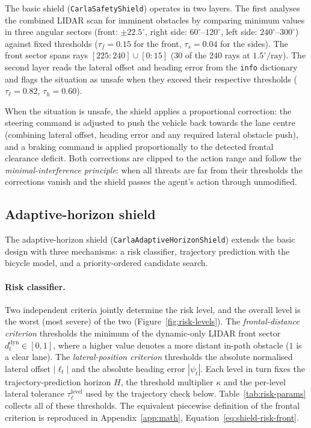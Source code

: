 The basic shield (\texttt{CarlaSafetyShield}) operates in two layers. The first analyses the
combined LIDAR scan for imminent obstacles by comparing minimum values in three angular sectors
(front: \(\pm22.5^\circ\), right side: \(60^\circ\)--\(120^\circ\), left side:
\(240^\circ\)--\(300^\circ\)) against fixed thresholds (\(\tau_f = 0.15\) for the front,
\(\tau_s = 0.04\) for the sides). The front sector spans rays \([225{:}240] \cup [0{:}15]\)
(30 of the 240 rays at \(1.5^\circ/\text{ray}\)). The second layer reads the lateral offset
and heading error from the \texttt{info} dictionary and flags the situation as unsafe when they
exceed their respective thresholds (\(\tau_\ell = 0.82\), \(\tau_h = 0.60\)).

When the situation is unsafe, the shield applies a proportional correction: the steering command
is adjusted to push the vehicle back towards the lane centre (combining lateral offset, heading
error and any required lateral obstacle push), and a braking command is applied proportionally
to the detected frontal clearance deficit. Both corrections are clipped to the action range and
follow the \emph{minimal-interference principle}: when all threats are far from their thresholds
the corrections vanish and the shield passes the agent's action through unmodified.

\subsection{Adaptive-horizon shield}\label{sec:design-adaptive-shield}

The adaptive-horizon shield (\texttt{CarlaAdaptiveHorizonShield}) extends the basic design with
three mechanisms: a risk classifier, trajectory prediction with the bicycle model, and a
priority-ordered candidate search.

\paragraph{Risk classifier.}
Two independent criteria jointly determine the risk level, and the overall level is the worst
(most severe) of the two (Figure~\ref{fig:risk-levels}). The \emph{frontal-distance criterion}
thresholds the minimum of the dynamic-only LIDAR front sector \(d^{\mathrm{dyn}}_t\in[0,1]\), where
a higher value denotes a more distant in-path obstacle (\(1\) is a clear lane). The
\emph{lateral-position criterion} thresholds the absolute normalised lateral offset \(|\ell_t|\)
and the absolute heading error \(|\psi_t|\). Each level in turn fixes the trajectory-prediction
horizon \(H\), the threshold multiplier \(\kappa\) and the per-level lateral tolerance
\(\tau_\ell^{\mathrm{level}}\) used by the trajectory check below. Table~\ref{tab:risk-params}
collects all of these thresholds. The equivalent piecewise definition of the frontal criterion is
reproduced in Appendix~\ref{app:math}, Equation~\eqref{eq:shield-risk-front}.

